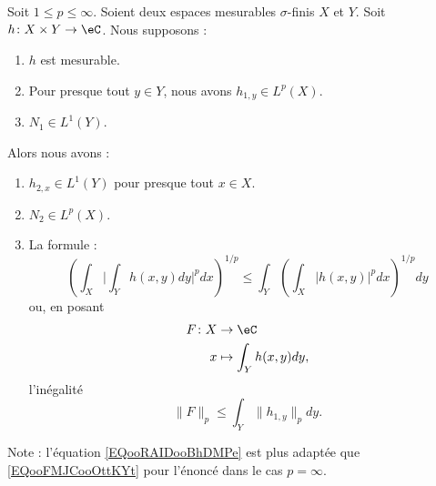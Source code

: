 \begin{proposition}	\label{PROPooINXBooTrTxwg}
	Soit \( 1\leq p\leq \infty\). Soient deux espaces mesurables \( \sigma\)-finis \( X\) et \( Y\). Soit \(h \colon X\times Y\to \eC  \). Nous supposons :
	\begin{enumerate}
		\item
		      \( h\) est mesurable.
		\item
		      Pour presque tout \( y\in Y\), nous avons \( h_{1,y}\in L^p(X)\).
		\item
		      \( N_1\in L^1(Y)\).
	\end{enumerate}
	Alors nous avons :
	\begin{enumerate}
		\item		\label{ITEMooCCQKooAyHfke}
		      \( h_{2,x}\in L^1(Y)\) pour presque tout \( x\in X\).
		\item		\label{ITEMooVWLZooUYAYuJ}
		      \( N_2\in L^p(X)\).
		\item	\label{ITEMooTBUEooQPnLEA}
		      La formule :
		      \begin{equation}		\label{EQooFMJCooOttKYt}
			      \left(   \int_X\Big|    \int_Y h(x,y) dy \Big|^pdx  \right)^{1/p}\leq  \int_Y\left( \int_X| h(x,y) |^pdx \right)^{1/p}dy
		      \end{equation}
		      ou, en posant
		      \begin{equation}
			      \begin{aligned}
				      F\colon X & \to \eC                 \\
				      x         & \mapsto \int_Yh(x,y)dy,
			      \end{aligned}
		      \end{equation}
		      l'inégalité
		      \begin{equation}		\label{EQooRAIDooBhDMPe}
			      \| F \|_p \leq \int_Y\| h_{1,y} \|_pdy.
		      \end{equation}
	\end{enumerate}
	Note : l'équation \eqref{EQooRAIDooBhDMPe} est plus adaptée que \eqref{EQooFMJCooOttKYt} pour l'énoncé dans le cas \( p=\infty\).
\end{proposition}

